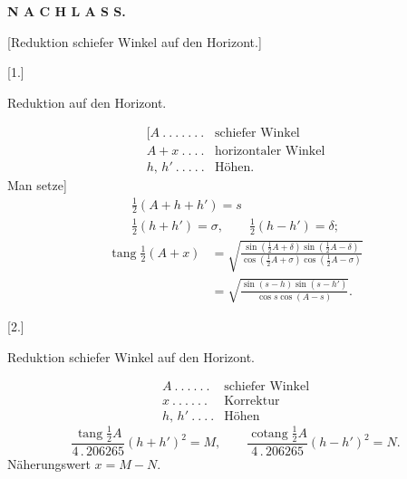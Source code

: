\par\clearpage\null\clearpage
\begin{center}
{\Large\textbf{N A C H L A S S.}}\par\bigskip
{\large [Reduktion schiefer Winkel auf den Horizont.]}\par\bigskip
{[}1.]\par\medskip
{\large Reduktion auf den Horizont.}
\end{center}
\[
\begin{array}{ll}
{[}A\ .\ .\ .\ .\ .\ .\ .&\text{schiefer Winkel}\\
A+x\ .\ .\ .\ .&\text{horizontaler Winkel}\\
h,\,h'\ .\ .\ .\ .\ .&\text{Höhen.}
\end{array}
\]
\noindent Man setze]
\[
\begin{gathered}
\tfrac12(A+h+h')=s\\
\tfrac12(h+h')=\sigma,\qquad\tfrac12(h-h')=\delta;
\end{gathered}
\]
\[
\begin{aligned}
\operatorname{tang}\tfrac12(A+x)
&=\sqrt{\frac{\sin(\frac12A+\delta)\sin(\frac12A-\delta)}{\cos(\frac12A+\sigma)\cos(\frac12A-\sigma)}}\\
&=\sqrt{\frac{\sin(s-h)\sin(s-h')}{\cos s\cos(A-s)}}.
\end{aligned}
\]
\begin{center}[2.]\par\medskip
{\large Reduktion schiefer Winkel auf den Horizont.}\end{center}
\[
\begin{array}{ll}
A\ .\ .\ .\ .\ .\ .&\text{schiefer Winkel}\\
x\ .\ .\ .\ .\ .\ .&\text{Korrektur}\\
h,\,h'\ .\ .\ .\ .&\text{Höhen}
\end{array}
\]
\[
\frac{\operatorname{tang}\frac12A}{4\,.\,206265}(h+h')^2=M,\qquad
\frac{\operatorname{cotang}\frac12A}{4\,.\,206265}(h-h')^2=N.
\]
\noindent Näherungswert $x=M-N$.

